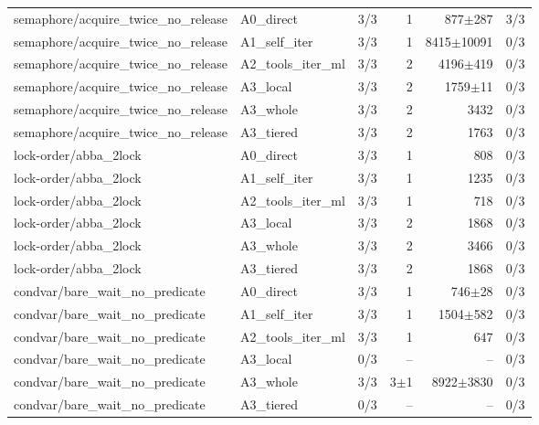 \begin{tabular}{llrrrr}
semaphore/acquire\_twice\_no\_release & A0\_direct & 3/3 & 1 & 877$\pm$287 & 3/3 \\
semaphore/acquire\_twice\_no\_release & A1\_self\_iter & 3/3 & 1 & 8415$\pm$10091 & 0/3 \\
semaphore/acquire\_twice\_no\_release & A2\_tools\_iter\_ml & 3/3 & 2 & 4196$\pm$419 & 0/3 \\
semaphore/acquire\_twice\_no\_release & A3\_local & 3/3 & 2 & 1759$\pm$11 & 0/3 \\
semaphore/acquire\_twice\_no\_release & A3\_whole & 3/3 & 2 & 3432 & 0/3 \\
semaphore/acquire\_twice\_no\_release & A3\_tiered & 3/3 & 2 & 1763 & 0/3 \\
lock-order/abba\_2lock & A0\_direct & 3/3 & 1 & 808 & 0/3 \\
lock-order/abba\_2lock & A1\_self\_iter & 3/3 & 1 & 1235 & 0/3 \\
lock-order/abba\_2lock & A2\_tools\_iter\_ml & 3/3 & 1 & 718 & 0/3 \\
lock-order/abba\_2lock & A3\_local & 3/3 & 2 & 1868 & 0/3 \\
lock-order/abba\_2lock & A3\_whole & 3/3 & 2 & 3466 & 0/3 \\
lock-order/abba\_2lock & A3\_tiered & 3/3 & 2 & 1868 & 0/3 \\
condvar/bare\_wait\_no\_predicate & A0\_direct & 3/3 & 1 & 746$\pm$28 & 0/3 \\
condvar/bare\_wait\_no\_predicate & A1\_self\_iter & 3/3 & 1 & 1504$\pm$582 & 0/3 \\
condvar/bare\_wait\_no\_predicate & A2\_tools\_iter\_ml & 3/3 & 1 & 647 & 0/3 \\
condvar/bare\_wait\_no\_predicate & A3\_local & 0/3 & -- & -- & 0/3 \\
condvar/bare\_wait\_no\_predicate & A3\_whole & 3/3 & 3$\pm$1 & 8922$\pm$3830 & 0/3 \\
condvar/bare\_wait\_no\_predicate & A3\_tiered & 0/3 & -- & -- & 0/3 \\
\bottomrule
\end{tabular}
